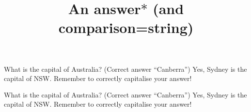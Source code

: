 \documentclass[onepage]{webquiz}
\title{An answer$*$ (and comparison=string)}
\begin{document}
  \begin{question}     %
     What is the capital of Australia?
      (Correct answer ``Canberra'')
     \whenRight  Yes, Sydney is the capital of NSW.
     \whenWrong Remember to correctly capitalise your answer!
  \end{question}
  \begin{question}     %
     What is the capital of Australia?
      (Correct answer ``Canberra'')
     \whenRight  Yes, Sydney is the capital of NSW.
     \whenWrong Remember to correctly capitalise your answer!
  \end{question}
\end{document}
